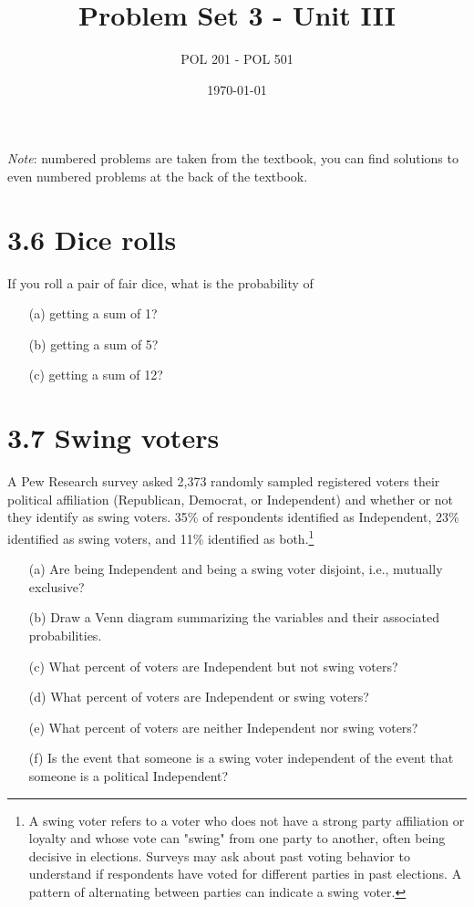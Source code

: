 \documentclass{article}
\title{Problem Set 3 - Unit III}
\author{POL 201 - POL 501}
\date{\today}
\begin{document}
\maketitle

\emph{Note}: numbered problems are taken from the textbook, you can find solutions to even numbered problems at the back of the textbook. 

\section*{3.6 Dice rolls}
If you roll a pair of fair dice, what is the probability of
\begin{enumerate}
    \item[(a)] getting a sum of 1?
    \item[(b)] getting a sum of 5?
    \item[(c)] getting a sum of 12?
\end{enumerate}

\section*{3.7 Swing voters}
A Pew Research survey asked 2,373 randomly sampled registered voters their political affiliation (Republican, Democrat, or Independent) and whether or not they identify as swing voters. 35\% of respondents identified as Independent, 23\% identified as swing voters, and 11\% identified as both.\footnote{A swing voter refers to a voter who does not have a strong party affiliation or loyalty and whose vote can "swing" from one party to another, often being decisive in elections. Surveys may ask about past voting behavior to understand if respondents have voted for different parties in past elections. A pattern of alternating between parties can indicate a swing voter.}
\begin{enumerate}
    \item[(a)] Are being Independent and being a swing voter disjoint, i.e., mutually exclusive?
    \item[(b)] Draw a Venn diagram summarizing the variables and their associated probabilities.
    \item[(c)] What percent of voters are Independent but not swing voters?
    \item[(d)] What percent of voters are Independent or swing voters?
    \item[(e)] What percent of voters are neither Independent nor swing voters?
    \item[(f)] Is the event that someone is a swing voter independent of the event that someone is a political Independent?
\end{enumerate}
\end{document}
